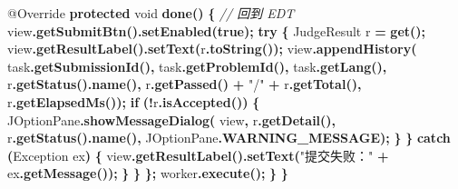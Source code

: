 \documentclass[
  11pt,
]{ctexart}
\newenvironment{Shaded}{\begin{snugshade}}{\end{snugshade}}
\newcommand{\AttributeTok}[1]{\textcolor[rgb]{0.13,0.29,0.53}{#1}}
\newcommand{\BuiltInTok}[1]{#1}
\newcommand{\CommentTok}[1]{\textcolor[rgb]{0.56,0.35,0.01}{\textit{#1}}}
\newcommand{\ControlFlowTok}[1]{\textcolor[rgb]{0.13,0.29,0.53}{\textbf{#1}}}
\newcommand{\DataTypeTok}[1]{\textcolor[rgb]{0.13,0.29,0.53}{#1}}
\newcommand{\FunctionTok}[1]{\textcolor[rgb]{0.13,0.29,0.53}{\textbf{#1}}}
\newcommand{\KeywordTok}[1]{\textcolor[rgb]{0.13,0.29,0.53}{\textbf{#1}}}
\newcommand{\NormalTok}[1]{#1}
\newcommand{\OperatorTok}[1]{\textcolor[rgb]{0.81,0.36,0.00}{\textbf{#1}}}
\newcommand{\StringTok}[1]{\textcolor[rgb]{0.31,0.60,0.02}{#1}}
\begin{document}
\begin{Shaded}
\begin{Highlighting}[]
            \AttributeTok{@Override}
            \KeywordTok{protected} \DataTypeTok{void} \FunctionTok{done}\OperatorTok{()} \OperatorTok{\{}  \CommentTok{// 回到 EDT}
\NormalTok{                view}\OperatorTok{.}\FunctionTok{getSubmitBtn}\OperatorTok{().}\FunctionTok{setEnabled}\OperatorTok{(}\KeywordTok{true}\OperatorTok{);}
                \ControlFlowTok{try} \OperatorTok{\{}
\NormalTok{                    JudgeResult r }\OperatorTok{=} \FunctionTok{get}\OperatorTok{();}
\NormalTok{                    view}\OperatorTok{.}\FunctionTok{getResultLabel}\OperatorTok{().}\FunctionTok{setText}\OperatorTok{(}\NormalTok{r}\OperatorTok{.}\FunctionTok{toString}\OperatorTok{());}
\NormalTok{                    view}\OperatorTok{.}\FunctionTok{appendHistory}\OperatorTok{(}
\NormalTok{                        task}\OperatorTok{.}\FunctionTok{getSubmissionId}\OperatorTok{(),}\NormalTok{ task}\OperatorTok{.}\FunctionTok{getProblemId}\OperatorTok{(),}
\NormalTok{                        task}\OperatorTok{.}\FunctionTok{getLang}\OperatorTok{(),}\NormalTok{ r}\OperatorTok{.}\FunctionTok{getStatus}\OperatorTok{().}\FunctionTok{name}\OperatorTok{(),}
\NormalTok{                        r}\OperatorTok{.}\FunctionTok{getPassed}\OperatorTok{()} \OperatorTok{+} \StringTok{"/"} \OperatorTok{+}\NormalTok{ r}\OperatorTok{.}\FunctionTok{getTotal}\OperatorTok{(),}
\NormalTok{                        r}\OperatorTok{.}\FunctionTok{getElapsedMs}\OperatorTok{());}
                    \ControlFlowTok{if} \OperatorTok{(!}\NormalTok{r}\OperatorTok{.}\FunctionTok{isAccepted}\OperatorTok{())} \OperatorTok{\{}
                        \BuiltInTok{JOptionPane}\OperatorTok{.}\FunctionTok{showMessageDialog}\OperatorTok{(}
\NormalTok{                            view}\OperatorTok{,}
\NormalTok{                            r}\OperatorTok{.}\FunctionTok{getDetail}\OperatorTok{(),}
\NormalTok{                            r}\OperatorTok{.}\FunctionTok{getStatus}\OperatorTok{().}\FunctionTok{name}\OperatorTok{(),}
                            \BuiltInTok{JOptionPane}\OperatorTok{.}\FunctionTok{WARNING\_MESSAGE}\OperatorTok{);}
                    \OperatorTok{\}}
                \OperatorTok{\}} \ControlFlowTok{catch} \OperatorTok{(}\BuiltInTok{Exception}\NormalTok{ ex}\OperatorTok{)} \OperatorTok{\{}
\NormalTok{                    view}\OperatorTok{.}\FunctionTok{getResultLabel}\OperatorTok{().}\FunctionTok{setText}\OperatorTok{(}\StringTok{"提交失败："} \OperatorTok{+}\NormalTok{ ex}\OperatorTok{.}\FunctionTok{getMessage}\OperatorTok{());}
                \OperatorTok{\}}
            \OperatorTok{\}}
        \OperatorTok{\};}
\NormalTok{        worker}\OperatorTok{.}\FunctionTok{execute}\OperatorTok{();}
    \OperatorTok{\}}
\OperatorTok{\}}
\end{Highlighting}
\end{Shaded}
\end{document}
